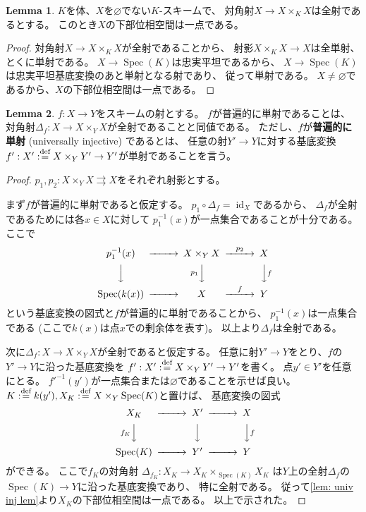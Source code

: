 \documentclass[uplatex]{jsarticle}
\theoremstyle{definition}
\newtheorem{lem}[lem]{Lemma}
\DeclareMathOperator{\id}{\mathrm{id}}
\DeclareMathOperator{\Spec}{\mathrm{Spec}}
\renewcommand{\emptyset}{\varnothing}
\def\dfn{:\overset{\mbox{{\scriptsize def}}}{=}}
\begin{document}
\begin{lem}\label{lem: univ inj lem}
  \(K\)を体、\(X\)を\(\emptyset\)でない\(K\)-スキームで、
  対角射\(X\to X\times_KX\)は全射であるとする。
  このとき\(X\)の下部位相空間は一点である。
\end{lem}

\begin{proof}
  対角射\(X\to X\times_KX\)が全射であることから、
  射影\(X\times_KX\to X\)は全単射、とくに単射である。
  \(X\to \Spec(K)\)は忠実平坦であるから、
  \(X\to\Spec(K)\)は忠実平坦基底変換のあと単射となる射であり、
  従って単射である。
  \(X\neq \emptyset\)であるから、\(X\)の下部位相空間は一点である。
\end{proof}


\begin{lem}\label{lem: univ inj}
  \(f:X\to Y\)をスキームの射とする。
  \(f\)が普遍的に単射であることは、
  対角射\(\Delta_f:X\to X\times_YX\)が全射であることと同値である。
  ただし、\(f\)が\textbf{普遍的に単射} (universally injective) であるとは、
  任意の射\(Y'\to Y\)に対する基底変換
  \(f':X'\dfn X\times_YY'\to Y'\)が単射であることを言う。
\end{lem}

\begin{proof}
  \(p_1,p_2:X\times_YX\rightrightarrows X\)をそれぞれ射影とする。

  まず\(f\)が普遍的に単射であると仮定する。
  \(p_1\circ \Delta_f=\id_X\)であるから、
  \(\Delta_f\)が全射であるためには各\(x\in X\)に対して
  \(p_1^{-1}(x)\)が一点集合であることが十分である。
  ここで
  \[
  \begin{CD}
    p_1^{-1}(x) @>>> X\times_YX @>p_2>> X \\
    @VVV @Vp_1VV @VVfV \\
    \Spec(k(x)) @>>> X @>f>> Y
  \end{CD}
  \]
  という基底変換の図式と\(f\)が普遍的に単射であることから、
  \(p_1^{-1}(x)\)は一点集合である
  (ここで\(k(x)\)は点\(x\)での剰余体を表す)。
  以上より\(\Delta_f\)は全射である。

  次に\(\Delta_f:X\to X\times_YX\)が全射であると仮定する。
  任意に射\(Y'\to Y\)をとり、\(f\)の\(Y'\to Y\)に沿った基底変換を
  \(f':X'\dfn X\times_YY'\to Y'\)を書く。
  点\(y'\in Y'\)を任意にとる。
  \(f'^{-1}(y')\)が一点集合または\(\emptyset\)であることを示せば良い。
  \(K\dfn k(y') , X_K\dfn X\times_Y\Spec(K)\)と置けば、
  基底変換の図式
  \[
  \begin{CD}
    X_K @>>> X' @>>> X \\
    @Vf_KVV @VVV @VVfV \\
    \Spec(K) @>>> Y' @>>> Y
  \end{CD}
  \]
  ができる。
  ここで\(f_K\)の対角射
  \(\Delta_{f_K}:X_K\to X_K\times_{\Spec(K)}X_K\)
  は\(Y\)上の全射\(\Delta_f\)の\(\Spec(K)\to Y\)に沿った基底変換であり、
  特に全射である。
  従って\autoref{lem: univ inj lem}より\(X_K\)の下部位相空間は一点である。
  以上で示された。
\end{proof}
\end{document}
